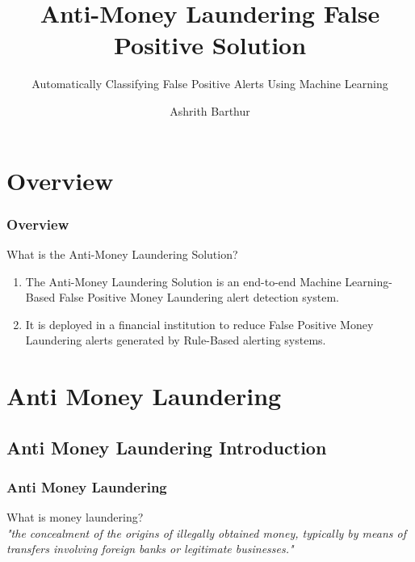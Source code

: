 \documentclass[11pt,
               aspectratio=169,
               hyperref={colorlinks}
               ]{beamer}
\author{Ashrith Barthur}
\title{Anti-Money Laundering False Positive Solution}
\subtitle{Automatically Classifying False Positive Alerts Using Machine Learning}
\institute{\href{https://www.h2o.ai}{H\textsubscript{2}O.ai}}
\begin{document}
	\maketitle
\section{Overview}
	\begin{frame}
		\frametitle{Overview}
		What is the Anti-Money Laundering Solution?\\
		\begin{enumerate}
			\item The Anti-Money Laundering Solution is an end-to-end Machine Learning-Based False Positive Money Laundering alert detection system.
			\item It is deployed in a financial institution to reduce False Positive Money Laundering alerts generated by Rule-Based alerting systems. 
		\end{enumerate}
	\end{frame}

\section{Anti Money Laundering}
	\subsection{Anti Money Laundering Introduction}
	\begin{frame}
		\frametitle{Anti Money Laundering}
		What is money laundering?\\
		\textit{"the concealment of the origins of illegally obtained money, typically by means of transfers involving foreign banks or legitimate businesses."}
	\end{frame}
\end{document}
